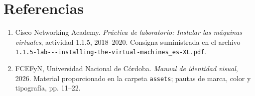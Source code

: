 \documentclass[12pt,a4paper]{article}
\begin{document}
\newpage
\section{Referencias}
\begin{enumerate}
  \item Cisco Networking Academy. \textit{Práctica de laboratorio: Instalar las máquinas virtuales}, actividad 1.1.5, 2018--2020. Consigna suministrada en el archivo \nolinkurl{1.1.5-lab---installing-the-virtual-machines_es-XL.pdf}.
  \item FCEFyN, Universidad Nacional de Córdoba. \textit{Manual de identidad visual}, 2026. Material proporcionado en la carpeta \texttt{assets}; pautas de marca, color y tipografía, pp. 11--22.
\end{enumerate}
\end{document}

